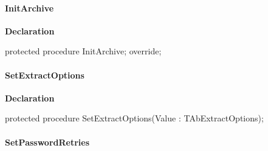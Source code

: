 \documentclass{report}
\newif\ifpdf
\begin{document}
\paragraph*{InitArchive}\hspace*{\fill}

\label{AbUnzper.TAbCustomUnZipper-InitArchive}
\begin{list}{}{
\setlength{\itemindent}{0cm}
\setlength{\listparindent}{0cm}
\setlength{\leftmargin}{\evensidemargin}
\addtolength{\leftmargin}{\tmplength}
\settowidth{\labelsep}{X}
\addtolength{\leftmargin}{\labelsep}
\setlength{\labelwidth}{\tmplength}
}
\item[\textbf{Declaration}\hfill]
\ifpdf
\begin{flushleft}
\fi
\begin{ttfamily}
protected procedure InitArchive; override;\end{ttfamily}

\ifpdf
\end{flushleft}
\fi

\end{list}
\paragraph*{SetExtractOptions}\hspace*{\fill}

\label{AbUnzper.TAbCustomUnZipper-SetExtractOptions}
\begin{list}{}{
\setlength{\itemindent}{0cm}
\setlength{\listparindent}{0cm}
\setlength{\leftmargin}{\evensidemargin}
\addtolength{\leftmargin}{\tmplength}
\settowidth{\labelsep}{X}
\addtolength{\leftmargin}{\labelsep}
\setlength{\labelwidth}{\tmplength}
}
\item[\textbf{Declaration}\hfill]
\ifpdf
\begin{flushleft}
\fi
\begin{ttfamily}
protected procedure SetExtractOptions(Value : TAbExtractOptions);\end{ttfamily}

\ifpdf
\end{flushleft}
\fi

\end{list}
\paragraph*{SetPasswordRetries}\hspace*{\fill}
\end{document}
